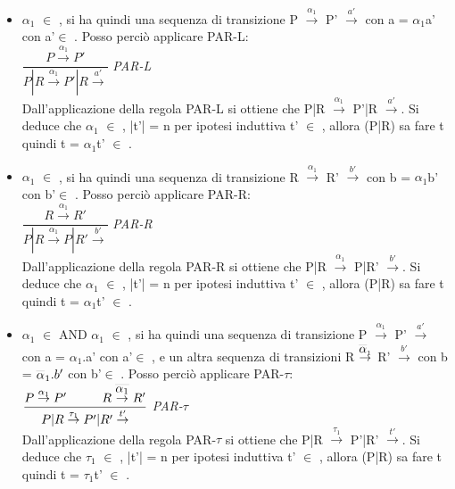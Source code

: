 \begin{itemize}
	\item $\alpha_{1}$ $\in$ , si ha quindi una sequenza di transizione P $\overset{\alpha_{1}}\rightarrow$ P' $\overset{a'}\rightarrow$ con a = $\alpha_{1}$a' con a'$\in$ . Posso perciò applicare PAR-L:\\
	
	$\dfrac{P \overset{\alpha_{1}}\rightarrow P'}{P|R \overset{\alpha_{1}}\rightarrow P'|R\overset{a'}\rightarrow}$ \textit{PAR-L} \\
	
	Dall'applicazione della regola PAR-L si ottiene che P|R $\overset{\alpha_{1}}\rightarrow $ P'|R $\overset{a'}\rightarrow$. Si deduce che $\alpha_{1}$ $\in$ , |t'| = n  per ipotesi induttiva t' $\in$ , allora (P|R) sa fare t quindi t = $\alpha_{1}$t' $\in$ .  \\
	
	\item $\alpha_{1}$ $\in$ , si ha quindi una sequenza di transizione R $\overset{\alpha_{1}}\rightarrow$ R' $\overset{b'}\rightarrow$ con b = $\alpha_{1}$b' con b'$\in$ . Posso perciò applicare PAR-R:\\
	
	$\dfrac{R \overset{\alpha_{1}}\rightarrow R'}{P|R \overset{\alpha_{1}}\rightarrow P|R'\overset{b'}\rightarrow}$ \textit{PAR-R} \\
	
	Dall'applicazione della regola PAR-R si ottiene che P|R $\overset{\alpha_{1}}\rightarrow $ P|R' $\overset{b'}\rightarrow$. Si deduce che $\alpha_{1}$ $\in$ , |t'| = n per ipotesi induttiva t' $\in$ , allora (P|R) sa fare t quindi t = $\alpha_{1}$t' $\in$ .\\
	
	\item $\alpha_{1}$ $\in$  AND $\alpha_{1}$ $\in$ , si ha quindi una sequenza di transizione P $\overset{\alpha_{1}}\rightarrow$ P' $\overset{a'}\rightarrow$ con a = $\alpha_{1}$.a' con a'$\in$ , e un altra sequenza di transizioni R $\overset{\Overline[0.1pt]\alpha_{1}}\rightarrow$ R' $\overset{b'}\rightarrow$ con b = $ \Overline[0.1pt]\alpha_{1}.b'$ con b'$\in$ . Posso perciò applicare PAR-$\tau$:\\
	
	$\dfrac{P \overset{\alpha_{1}}\rightarrow P' \hspace{1cm} R \overset{\Overline[0.1pt]{\alpha_{1}}}\rightarrow R'}{P|R \overset{\tau_{1}}\rightarrow P'|R'\overset{t'}\rightarrow}$ \textit{PAR-$\tau$}\\
	
	Dall'applicazione della regola PAR-$\tau$ si ottiene che P|R $\overset{\tau_{1}}\rightarrow $ P'|R' $\overset{t'}\rightarrow$. Si deduce che $\tau_{1}$ $\in$ , |t'| = n per ipotesi induttiva t' $\in$ , allora (P|R) sa fare t quindi t = $\tau_{1}$t' $\in$ .\\

	
\end{itemize}

